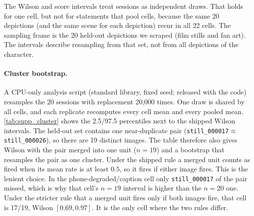 The Wilson and score intervals treat sessions as independent draws. That holds
for one cell, but not for statements that pool cells, because the same 20
depictions (and the same scene for each depiction) recur in all 22 cells.
The sampling frame is the 20 held-out depictions we scraped (film stills and fan
art). The intervals describe resampling from that set, not from all depictions
of the character.

\paragraph{Cluster bootstrap.}
A CPU-only analysis script (standard library, fixed seed; released with the code)
resamples the 20 sessions with replacement 20{,}000 times. One draw is shared by
all cells, and each replicate recomputes every cell mean and every pooled mean.
\cref{tab:supp_cluster} shows the 2.5/97.5 percentiles next to the shipped
Wilson intervals. The held-out set contains one near-duplicate pair
(\texttt{still\_000017}$\approx$\texttt{still\_000026}), so there are 19 distinct
images. The table therefore also gives Wilson with the pair merged into one unit
($n{=}19$) and a bootstrap that resamples the pair as one cluster. Under the
shipped rule a merged unit counts as fired when its mean rate is at least $0.5$,
so it fires if either image fires. This is the lenient choice. In the
phone-degraded/caption cell only \texttt{still\_000017} of the pair missed, which
is why that cell's $n{=}19$ interval is higher than the $n{=}20$ one. Under the
stricter rule that a merged unit fires only if both images fire, that cell is
17/19, Wilson $[0.69, 0.97]$. It is the only cell where the two rules differ.

